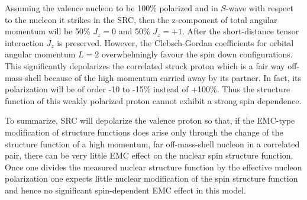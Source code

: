\documentclass{ws-ijmpe}
\begin{document}
Assuming the valence nucleon to be 100\% polarized and in $S$-wave with respect to the nucleon it strikes in the SRC, then the z-component of total angular momentum will be 50\% $J_z=0$ and 50\% $J_z=+1$. After the short-distance tensor interaction $J_z$ is preserved. However, the Clebsch-Gordan coefficients  for orbital angular momentum $L=2$ overwhelmingly favour the spin down configurations. This significantly depolarizes the correlated struck proton which is a fair way off-mass-shell because of the high momentum carried away by its partner. In fact, its polarization will be of order -10 to -15\% instead of +100\%. Thus the structure function of this weakly polarized proton cannot exhibit a strong spin dependence.

To summarize, SRC will depolarize the valence proton so that, if the EMC-type modification of structure functions does arise only through the change of the structure function of a high momentum, far off-mass-shell nucleon in a correlated pair, there can be very little EMC effect on the nuclear spin structure function. Once one divides the measured nuclear structure function by the effective nucleon polarization one expects little nuclear modification of the spin structure function and hence no significant spin-dependent EMC effect in this model.
\end{document}
